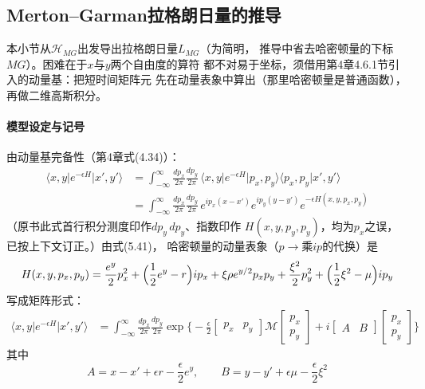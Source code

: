 \subsection*{Merton--Garman拉格朗日量的推导}

本小节从$\mathcal{H}_{MG}$出发导出拉格朗日量$L_{MG}$（为简明，
推导中省去哈密顿量的下标$MG$）。困难在于$x$与$y$两个自由度的算符
都不对易于坐标，须借用第4章4.6.1节引入的动量基：把短时间矩阵元
先在动量表象中算出（那里哈密顿量是普通函数），再做二维高斯积分。

\paragraph{模型设定与记号}
由动量基完备性（第4章式(4.34)）：
\begin{align*}
\langle x,y\vert e^{-\epsilon H}\vert x',y'\rangle
&=\int_{-\infty}^{\infty}\frac{dp_{x}}{2\pi}\frac{dp_{y}}{2\pi}\,
\langle x,y\vert e^{-\epsilon H}\vert p_{x},p_{y}\rangle
\langle p_{x},p_{y}\vert x',y'\rangle\\
&=\int_{-\infty}^{\infty}\frac{dp_{x}}{2\pi}\frac{dp_{y}}{2\pi}\,
e^{ip_{x}(x-x')}e^{ip_{y}(y-y')}e^{-\epsilon H(x,y,p_{x},p_{y})}
\tag{5.42}
\end{align*}
（原书此式首行积分测度印作$dp_{y}\,dp_{y}$、指数印作
$H(x,y,p_{y},p_{y})$，均为$p_{x}$之误，已按上下文订正。）由式(5.41)，
哈密顿量的动量表象（$p\to$乘$ip$的代换）是
\begin{equation*}
H(x,y,p_{x},p_{y})=\frac{e^{y}}{2}p_{x}^{2}
+\Bigl(\frac{1}{2}e^{y}-r\Bigr)ip_{x}
+\xi\rho e^{y/2}p_{x}p_{y}
+\frac{\xi^{2}}{2}p_{y}^{2}
+\Bigl(\frac{1}{2}\xi^{2}-\mu\Bigr)ip_{y}
\end{equation*}
写成矩阵形式：
\begin{align*}
\langle x,y\vert e^{-\epsilon H}\vert x',y'\rangle
&=\int_{-\infty}^{\infty}\frac{dp_{x}}{2\pi}\frac{dp_{y}}{2\pi}
\exp\biggl\{-\frac{\epsilon}{2}
\begin{bmatrix}p_{x} & p_{y}\end{bmatrix}\mathcal{M}
\begin{bmatrix}p_{x}\\ p_{y}\end{bmatrix}
+i\begin{bmatrix}A & B\end{bmatrix}
\begin{bmatrix}p_{x}\\ p_{y}\end{bmatrix}\biggr\}
\tag{5.43}
\end{align*}
其中
\begin{equation*}
A=x-x'+\epsilon r-\frac{\epsilon}{2}e^{y},\qquad
B=y-y'+\epsilon\mu-\frac{\epsilon}{2}\xi^{2}
\end{equation*}
